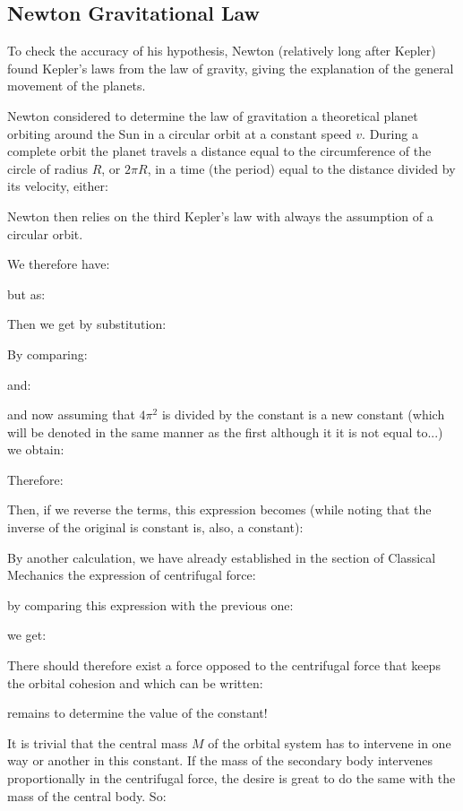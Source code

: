 	\pagebreak
	\subsection{Newton Gravitational Law}
	To check the accuracy of his hypothesis, Newton (relatively long after Kepler) found Kepler's laws from the law of gravity, giving the explanation of the general movement of the planets.
	
	Newton considered to determine the law of gravitation a theoretical planet orbiting around the Sun in a circular orbit at a constant speed $v$. During a complete orbit the planet travels a distance equal to the circumference of the circle of radius $R$, or $2\pi R$, in a time (the period) equal to the distance divided by its velocity, either:
	
	Newton then relies on the third Kepler's law with always the assumption of a circular orbit.
	
	We therefore have:
	
	but as:
	
	Then we get by substitution:
	
	By comparing:
	
	and:
	
	and now assuming that $4\pi^2$ is divided by the constant is a new constant (which will be denoted in the same manner as the first although it it is not equal to...) we obtain:
	
	Therefore:
	
	Then, if we reverse the terms, this expression becomes (while noting that the inverse of the original is constant is, also, a constant):
	
	By another calculation, we have already established in the section of Classical Mechanics the expression of centrifugal force:
	
	by comparing this expression with the previous one:
	
	we get:
	
	There should therefore exist a force opposed to the centrifugal force that keeps the orbital cohesion and which can be written:
	
	remains to determine the value of the constant!
	
	It is trivial that the central mass $M$ of the orbital system has to intervene in one way or another in this constant. If the mass of the secondary body intervenes proportionally in the centrifugal force, the desire is great to do the same with the mass of the central body. So:
	
